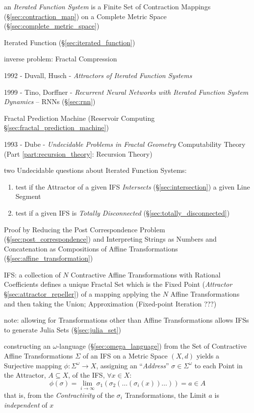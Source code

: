 an \emph{Iterated Function System} is a Finite Set of Contraction Mappings
(\S\ref{sec:contraction_map}) on a Complete Metric Space
(\S\ref{sec:complete_metric_space})

Iterated Function (\S\ref{sec:iterated_function})

inverse problem: Fractal Compression

1992 - Duvall, Husch - \emph{Attractors of Iterated Function Systems}

1999 - Tino, Dorffner - \emph{Recurrent Neural Networks with Iterated Function
  System Dynamics} -- RNNs (\S\ref{sec:rnn})

\fist Fractal Prediction Machine (Reservoir Computing
\S\ref{sec:fractal_prediction_machine})

\asterism

1993 - Dube - \emph{Undecidable Problems in Fractal Geometry} \fist
Computability Theory (Part \ref{part:recursion_theory}: Recursion Theory)

two Undecidable questions about Iterated Function Systems:
\begin{enumerate}
  \item test if the Attractor of a given IFS \emph{Intersects}
    (\S\ref{sec:intersection}) a given Line Segment
  \item test if a given IFS is \emph{Totally Disconnected}
    (\S\ref{sec:totally_disconnected})
\end{enumerate}

Proof by Reducing the Post Correspondence Problem
(\S\ref{sec:post_correspondence}) and Interpreting Strings as Numbers and
Concatenation as Compositions of Affine Transformations
(\S\ref{sec:affine_transformation})

IFS: a collection of $N$ Contractive Affine Transformations with Rational
Coefficients defines a unique Fractal Set which is the Fixed Point
(\emph{Attractor} \S\ref{sec:attractor_repeller}) of a mapping applying the $N$
Affine Transformations and then taking the Union; Approximation (Fixed-point
Iteration ???)

note: allowing for Transformations other than Affine Transformations allows IFSs
to generate Julia Sets (\S\ref{sec:julia_set})

constructing an $\omega$-language (\S\ref{sec:omega_language}) from the Set of
Contractive Affine Transformations $\Sigma$ of an IFS on a Metric Space $(X, d)$
yields a Surjective mapping $\phi : \Sigma^\omega \rightarrow X$, assigning an
``\emph{Address}'' $\sigma \in \Sigma^\omega$ to each Point in the Attractor,
$A \subseteq X$, of the IFS, $\forall x \in X$:
\[
  \phi(\sigma) =
    \lim_{i \rightarrow \infty} \sigma_1(\sigma_2(\ldots(\sigma_i(x))\ldots)) =
    a \in A
\]
that is, from the \emph{Contractivity} of the $\sigma_i$ Transformations, the
Limit $a$ is \emph{independent} of $x$

